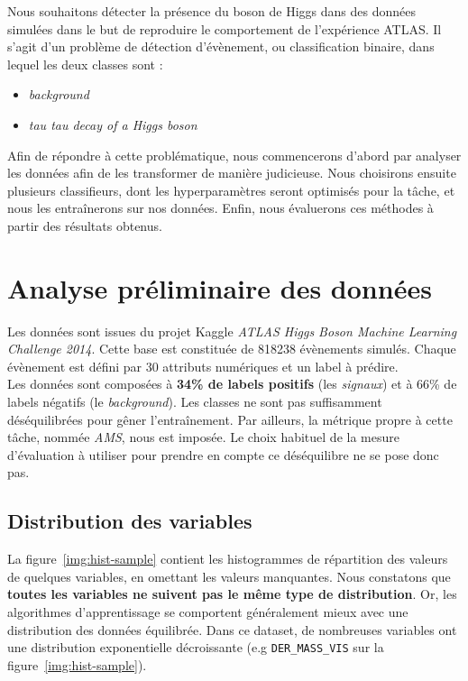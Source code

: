 \documentclass[12pt]{article}
\newcommand{\figref}[1]{figure~\ref{#1}}
\begin{document}
Nous souhaitons détecter la présence du boson de Higgs dans des données simulées
dans le but de reproduire le comportement de l'expérience ATLAS. Il s'agit d'un
problème de détection d'évènement, ou classification binaire, dans lequel les
deux classes sont :

\begin{itemize}
    \item \emph{background}
    \item \emph{tau tau decay of a Higgs boson}
\end{itemize}

Afin de répondre à cette problématique, nous commencerons d'abord par analyser
les données afin de les transformer de manière judicieuse. Nous choisirons
ensuite plusieurs classifieurs, dont les hyperparamètres seront optimisés pour
la tâche, et nous les entraînerons sur nos données. Enfin, nous évaluerons ces
méthodes à partir des résultats obtenus. 

\section{Analyse préliminaire des données}

Les données sont issues du projet Kaggle \emph{ATLAS Higgs Boson Machine
Learning Challenge 2014}. Cette base est constituée de 818238 évènements
simulés. Chaque évènement est défini par 30 attributs numériques et un label à
prédire. \\

Les données sont composées à \textbf{34\% de labels positifs} (les
\emph{signaux}) et à 66\% de labels négatifs (le \emph{background}). Les classes
ne sont pas suffisamment déséquilibrées pour gêner l'entraînement. Par ailleurs,
la métrique propre à cette tâche, nommée \emph{AMS}, nous est imposée. Le choix
habituel de la mesure d'évaluation à utiliser pour prendre en compte ce
déséquilibre ne se pose donc pas. \\

\subsection{Distribution des variables}

La \figref{img:hist-sample} contient les histogrammes de répartition des valeurs
de quelques variables, en omettant les valeurs manquantes. Nous constatons que
\textbf{toutes les variables ne suivent pas le même type de distribution}. Or, les
algorithmes d'apprentissage se comportent généralement mieux avec une
distribution des données équilibrée. Dans ce dataset, de nombreuses variables
ont une distribution exponentielle décroissante (e.g \texttt{DER\_MASS\_VIS} sur
la \figref{img:hist-sample}).
\end{document}
